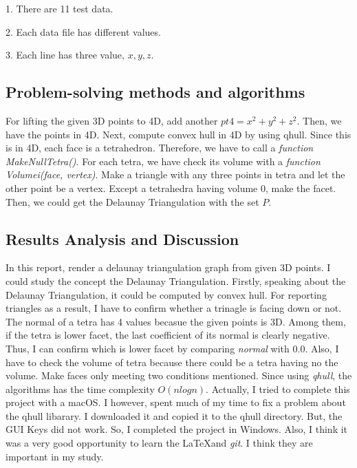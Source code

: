 \documentclass[11pt]{article}
\begin{document}
1. There are 11 test data.

2. Each data file has different values.

3. Each line has three value, $x, y, z$.

\clearpage

\subsection{Problem-solving methods and algorithms}

For lifting the given 3D points to 4D, add another $pt4 = x^2 + y^2 + z^2$. Then, we have the points in 4D. Next, compute convex hull in 4D by using qhull. Since this is in 4D, each face is a tetrahedron. Therefore, we have to call a \textit{function MakeNullTetra()}. For each tetra, we have check its volume with a \textit{function Volumei(face, vertex)}. Make a triangle with any three points in tetra and let the other point be a vertex. Except a tetrahedra having volume $0$, make the facet. Then, we could get the Delaunay Triangulation with the set $P$.

\subsection{Results Analysis and Discussion}
In this report, render a delaunay triangulation graph from given 3D points. I could study the concept the Delaunay Triangulation. Firstly, speaking about the Delaunay Triangulation, it could be computed by convex hull. For reporting triangles as a result, I have to confirm whether a trinagle is facing down or not. The normal of a tetra has 4 values becasue the given points is 3D. Among them, if the tetra is lower facet, the last coefficient of its normal is clearly negative. 
Thus, I can confirm which is lower facet by comparing \textit{normal} with $0.0$. Also, I have to check the volume of tetra because there could be a tetra having no the volume. Make faces only meeting two conditions mentioned. Since using \textit{qhull}, the algorithms has the time complexity $O(nlogn)$.
Actually, I tried to complete this project with a macOS. I however, spent much of my time to fix a problem about the qhull libarary. I downloaded it and copied it to the qhull directory. But, the GUI Keys did not work. So, I completed the project in Windows. Also, I think it was a very good opportunity to learn the \LaTeX and \textit{git}. I think they are important in my study.

\clearpage
\end{document}

